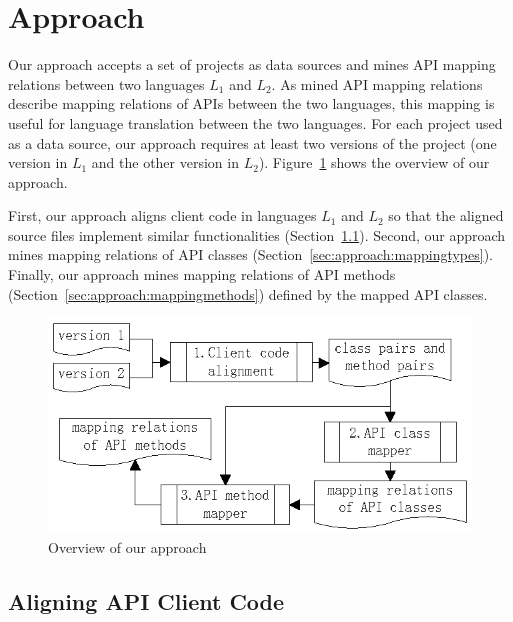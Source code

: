 \section{Approach}
\label{sec:approach}

Our approach accepts a set of projects as data sources and mines API
mapping relations between two languages $L_1$ and $L_2$. As mined
API mapping relations describe mapping relations of APIs between the
two languages, this mapping is useful for language translation
between the two languages. For each project used as a data source,
our approach requires at least two versions of the project (one
version in $L_1$ and the other version in $L_2$).
Figure~\ref{fig:approach} shows the overview of our approach.

First, our approach aligns client code in languages $L_1$ and $L_2$
so that the aligned source files implement similar functionalities
(Section~\ref{sec:approach:acc}). Second, our approach mines
mapping relations of API classes (Section~\ref{sec:approach:mappingtypes}).
Finally, our approach mines mapping relations of API
methods (Section~\ref{sec:approach:mappingmethods}) defined by the mapped
API classes.

\begin{figure}[t]
\centering
\includegraphics[scale=1,clip]{figure/approach.eps}\vspace*{-3ex}
 \caption{Overview of our approach}\vspace*{-3.5ex}
 \label{fig:approach}
\end{figure}

\subsection{Aligning API Client Code}
\label{sec:approach:acc}

